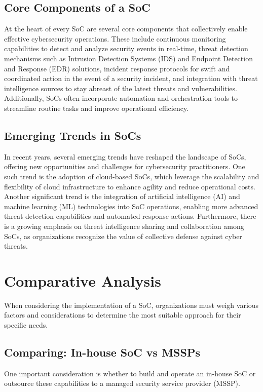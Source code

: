 \subsection{Core Components of a SoC}
At the heart of every SoC are several core components that collectively enable effective cybersecurity operations.
These include continuous monitoring capabilities to detect and analyze security events in real-time, threat detection mechanisms such as Intrusion Detection Systems (IDS) and Endpoint Detection and Response (EDR) solutions, incident response protocols for swift and coordinated action in the event of a security incident, and integration with threat intelligence sources to stay abreast of the latest threats and vulnerabilities.
Additionally, SoCs often incorporate automation and orchestration tools to streamline routine tasks and improve operational efficiency.

\subsection{Emerging Trends in SoCs}
In recent years, several emerging trends have reshaped the landscape of SoCs, offering new opportunities and challenges for cybersecurity practitioners.
One such trend is the adoption of cloud-based SoCs, which leverage the scalability and flexibility of cloud infrastructure to enhance agility and reduce operational costs.
Another significant trend is the integration of artificial intelligence (AI) and machine learning (ML) technologies into SoC operations, enabling more advanced threat detection capabilities and automated response actions.
Furthermore, there is a growing emphasis on threat intelligence sharing and collaboration among SoCs, as organizations recognize the value of collective defense against cyber threats.

\section{Comparative Analysis}
When considering the implementation of a SoC, organizations must weigh various factors and considerations to determine the most suitable approach for their specific needs.

\subsection{Comparing: In-house SoC vs MSSPs}
One important consideration is whether to build and operate an in-house SoC or outsource these capabilities to a managed security service provider (MSSP).

